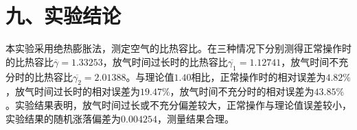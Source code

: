 \documentclass[11pt]{article}
\begin{document}
\section*{九、实验结论}

本实验采用绝热膨胀法，测定空气的比热容比。在三种情况下分别测得正常操作时的比热容比$\overline{\gamma}=1.33253$，放气时间过长时的比热容比$\overline{\gamma_1}=1.12741$，放气时间不充分时的比热容比$\overline{\gamma_2}=2.01388$。与理论值$1.40$相比，正常操作时的相对误差为$4.82\%$，放气时间过长时的相对误差为$19.47\%$，放气时间不充分时的相对误差为$43.85\%$。实验结果表明，放气时间过长或不充分偏差较大，正常操作与理论值误差较小，实验结果的随机涨落偏差为$0.004254$，测量结果合理。
\end{document}
